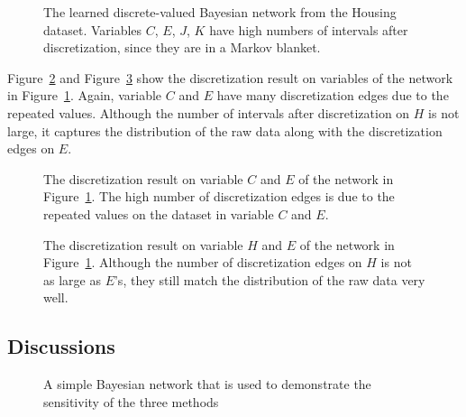 \begin{figure}[ht]
    \centering
    \scalebox{0.8}{
      }
  \caption{The learned discrete-valued Bayesian network from the Housing dataset. Variables $C$, $E$, $J$, $K$ have high numbers of intervals after discretization, since they are in a Markov blanket.
  }
  \label{fig:housing_graph_2}
\end{figure}

Figure~\ref{fig:housing_exp2_distr_3_5} and Figure~\ref{fig:housing_exp2_distr_8_5} show the discretization result on variables of the network in Figure~\ref{fig:housing_graph_2}.
Again, variable $C$ and $E$ have many discretization edges due to the repeated values.
Although the number of intervals after discretization on $H$ is not large, it captures the distribution of the raw data along with the discretization edges on $E$.

\begin{figure}[ht]
\centering
      
  \caption{The discretization result on variable $C$ and $E$ of the network in Figure~\ref{fig:housing_graph_2}. The high number of discretization edges is due to the repeated values on the dataset in variable $C$ and $E$.}
  \label{fig:housing_exp2_distr_3_5}
\end{figure}

\begin{figure}[ht]
\centering
      
  \caption{The discretization result on variable $H$ and $E$ of the network in Figure~\ref{fig:housing_graph_2}. Although the number of discretization edges on $H$ is not as large as $E$'s, they still match the distribution of the raw data very well.}
  \label{fig:housing_exp2_distr_8_5}
\end{figure}

\subsection{Discussions}
\label{subsec:discuss_exp}

\begin{figure}[ht]
\centering
      
  \caption{A simple Bayesian network that is used to demonstrate the sensitivity of the three methods}
  \label{fig:exp_discuss}
\end{figure}

